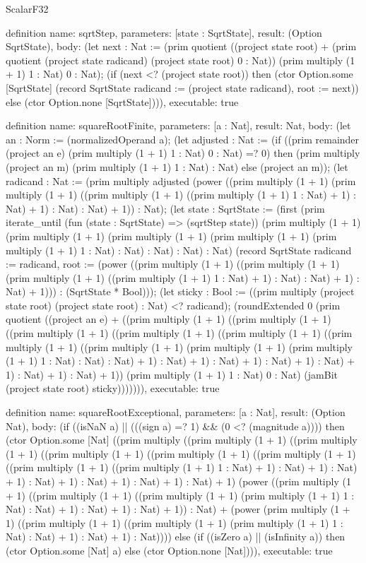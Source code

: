\begin{lexlean}{ScalarF32}
\begin{semanticmodule}
definition{
  name: sqrtStep,
  parameters: [state : SqrtState],
  result: (Option SqrtState),
  body: (let next : Nat := (prim quotient ((project state root) + (prim quotient (project state radicand) (project state root) 0 : Nat)) (prim multiply (1 + 1) 1 : Nat) 0 : Nat); (if (next <? (project state root)) then (ctor Option.some [SqrtState] (record SqrtState {radicand := (project state radicand), root := next})) else (ctor Option.none [SqrtState]))),
  executable: true
}

definition{
  name: squareRootFinite,
  parameters: [a : Nat],
  result: Nat,
  body: (let an : Norm := (normalizedOperand a); (let adjusted : Nat := (if ((prim remainder (project an e) (prim multiply (1 + 1) 1 : Nat) 0 : Nat) =? 0) then (prim multiply (project an m) (prim multiply (1 + 1) 1 : Nat) : Nat) else (project an m)); (let radicand : Nat := (prim multiply adjusted (power ((prim multiply (1 + 1) (prim multiply (1 + 1) ((prim multiply (1 + 1) ((prim multiply (1 + 1) 1 : Nat) + 1) : Nat) + 1) : Nat) : Nat) + 1)) : Nat); (let state : SqrtState := (first (prim iterate_until (fun (state : SqrtState) => (sqrtStep state)) (prim multiply (1 + 1) (prim multiply (1 + 1) (prim multiply (1 + 1) (prim multiply (1 + 1) (prim multiply (1 + 1) 1 : Nat) : Nat) : Nat) : Nat) : Nat) (record SqrtState {radicand := radicand, root := (power ((prim multiply (1 + 1) ((prim multiply (1 + 1) (prim multiply (1 + 1) ((prim multiply (1 + 1) 1 : Nat) + 1) : Nat) : Nat) + 1) : Nat) + 1))}) : (SqrtState * Bool))); (let sticky : Bool := ((prim multiply (project state root) (project state root) : Nat) <? radicand); (roundExtended 0 (prim quotient ((project an e) + ((prim multiply (1 + 1) ((prim multiply (1 + 1) ((prim multiply (1 + 1) ((prim multiply (1 + 1) ((prim multiply (1 + 1) ((prim multiply (1 + 1) ((prim multiply (1 + 1) (prim multiply (1 + 1) (prim multiply (1 + 1) 1 : Nat) : Nat) : Nat) + 1) : Nat) + 1) : Nat) + 1) : Nat) + 1) : Nat) + 1) : Nat) + 1) : Nat) + 1)) (prim multiply (1 + 1) 1 : Nat) 0 : Nat) (jamBit (project state root) sticky))))))),
  executable: true
}

definition{
  name: squareRootExceptional,
  parameters: [a : Nat],
  result: (Option Nat),
  body: (if ((isNaN a) || (((sign a) =? 1) && (0 <? (magnitude a)))) then (ctor Option.some [Nat] ((prim multiply ((prim multiply (1 + 1) ((prim multiply (1 + 1) ((prim multiply (1 + 1) ((prim multiply (1 + 1) ((prim multiply (1 + 1) ((prim multiply (1 + 1) ((prim multiply (1 + 1) 1 : Nat) + 1) : Nat) + 1) : Nat) + 1) : Nat) + 1) : Nat) + 1) : Nat) + 1) : Nat) + 1) (power ((prim multiply (1 + 1) ((prim multiply (1 + 1) ((prim multiply (1 + 1) (prim multiply (1 + 1) 1 : Nat) : Nat) + 1) : Nat) + 1) : Nat) + 1)) : Nat) + (power (prim multiply (1 + 1) ((prim multiply (1 + 1) ((prim multiply (1 + 1) (prim multiply (1 + 1) 1 : Nat) : Nat) + 1) : Nat) + 1) : Nat)))) else (if ((isZero a) || (isInfinity a)) then (ctor Option.some [Nat] a) else (ctor Option.none [Nat]))),
  executable: true
}


\end{semanticmodule}
\end{lexlean}
